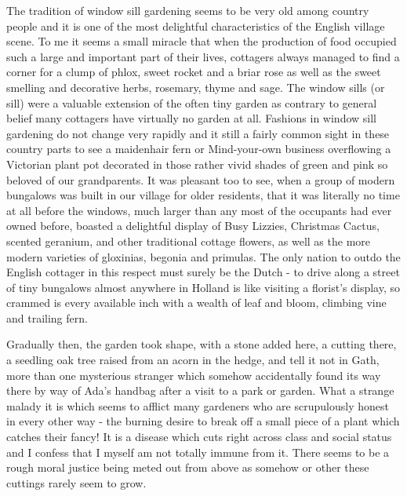 The tradition of window sill gardening seems to be very old among country people and it is one of the most delightful characteristics of the English village scene. To me it seems a small miracle that when the production of food occupied such a large and important part of their lives, cottagers always managed to find a corner for a clump of phlox, sweet rocket and a briar rose as well as the sweet smelling and decorative herbs, rosemary, thyme and sage. The window sills (or sill) were a valuable extension of the often tiny garden as contrary to general belief many cottagers have virtually no garden at all. Fashions in window sill gardening do not change very rapidly and it still a fairly common sight in these country parts to see a maidenhair fern or Mind-your-own business overflowing a Victorian plant pot decorated in those rather vivid shades of green and pink so beloved of our grandparents. It was pleasant too to see, when a group of modern bungalows was built in our village for older residents, that it was literally no time at all before the windows, much larger than any most of the occupants had ever owned before, boasted a delightful display of Busy Lizzies, Christmas Cactus, scented geranium, and other traditional cottage flowers, as well as the more modern varieties of gloxinias, begonia and primulas. The only nation to outdo the English cottager in this respect must surely be the Dutch - to drive along a street of tiny bungalows almost anywhere in Holland is like visiting a florist's display, so crammed is every available inch with a wealth of leaf and bloom, climbing vine and trailing fern.

Gradually then, the garden took shape, with a stone added here, a cutting there, a seedling oak tree raised from an acorn in the hedge, and tell it not in Gath, more than one mysterious stranger which somehow accidentally found its way there by way of Ada’s handbag after a visit to a park or garden. What a strange malady it is which seems to afflict many gardeners who are scrupulously honest in every other way - the burning desire to break off a small piece of a plant which catches their fancy! It is a disease which cuts right across class and social status and I confess that I myself am not totally immune from it. There seems to be a rough moral justice being meted out from above as somehow or other these  cuttings rarely seem to grow.

